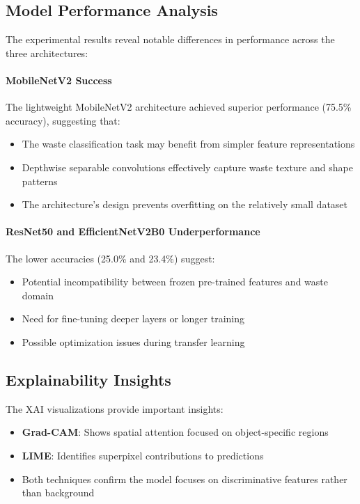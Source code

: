 \documentclass[11pt,a4paper]{article}
\begin{document}
\subsection{Model Performance Analysis}

The experimental results reveal notable differences in performance across the three architectures:

\paragraph{MobileNetV2 Success} The lightweight MobileNetV2 architecture achieved superior performance (75.5\% accuracy), suggesting that:
\begin{itemize}
    \item The waste classification task may benefit from simpler feature representations
    \item Depthwise separable convolutions effectively capture waste texture and shape patterns
    \item The architecture's design prevents overfitting on the relatively small dataset
\end{itemize}

\paragraph{ResNet50 and EfficientNetV2B0 Underperformance} The lower accuracies (25.0\% and 23.4\%) suggest:
\begin{itemize}
    \item Potential incompatibility between frozen pre-trained features and waste domain
    \item Need for fine-tuning deeper layers or longer training
    \item Possible optimization issues during transfer learning
\end{itemize}

\subsection{Explainability Insights}

The XAI visualizations provide important insights:
\begin{itemize}
    \item \textbf{Grad-CAM}: Shows spatial attention focused on object-specific regions
    \item \textbf{LIME}: Identifies superpixel contributions to predictions
    \item Both techniques confirm the model focuses on discriminative features rather than background
\end{itemize}
\end{document}
